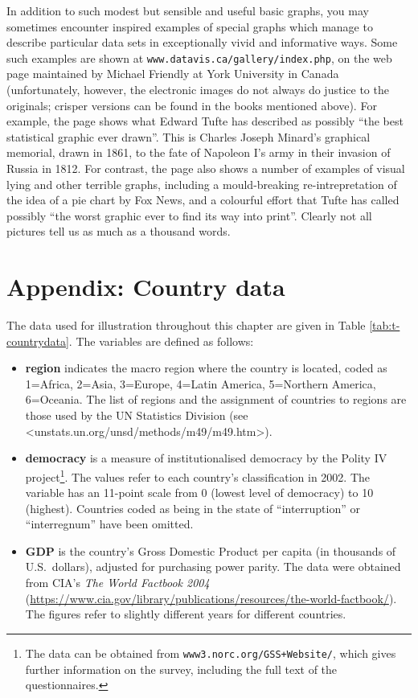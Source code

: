\documentclass[11pt,a4paper,openany]{book}
\let\rmarkdownfootnote\footnote%
\def\footnote{\protect\rmarkdownfootnote}
\begin{document}
In addition to such modest but sensible and useful basic graphs, you may
sometimes encounter inspired examples of special graphs which manage to
describe particular data sets in exceptionally vivid and informative
ways. Some such examples are shown at
\texttt{www.datavis.ca/gallery/index.php}, on the web page maintained by
Michael Friendly at York University in Canada (unfortunately, however,
the electronic images do not always do justice to the originals; crisper
versions can be found in the books mentioned above). For example, the
page shows what Edward Tufte has described as possibly ``the best
statistical graphic ever drawn''. This is Charles Joseph Minard's
graphical memorial, drawn in 1861, to the fate of Napoleon I's army in
their invasion of Russia in 1812. For contrast, the page also shows a
number of examples of visual lying and other terrible graphs, including
a mould-breaking re-intrepretation of the idea of a pie chart by Fox
News, and a colourful effort that Tufte has called possibly ``the worst
graphic ever to find its way into print''. Clearly not all pictures tell
us as much as a thousand words.

\section{Appendix: Country data}\label{s-descr1-app}

The data used for illustration throughout this chapter are given in
Table \ref{tab:t-countrydata}. The variables are defined as follows:

\begin{itemize}
\item
  \textbf{region} indicates the macro region where the country is
  located, coded as 1=Africa, 2=Asia, 3=Europe, 4=Latin America,
  5=Northern America, 6=Oceania. The list of regions and the assignment
  of countries to regions are those used by the UN Statistics Division
  (see
  \textless{}unstats.un.org/unsd/methods/m49/m49.htm\textgreater{}).
\item
  \textbf{democracy} is a measure of institutionalised democracy by the
  Polity IV project\footnote{The data can be obtained from
    \texttt{www3.norc.org/GSS+Website/}, which gives further information
    on the survey, including the full text of the questionnaires.}. The
  values refer to each country's classification in 2002. The variable
  has an 11-point scale from 0 (lowest level of democracy) to 10
  (highest). Countries coded as being in the state of ``interruption''
  or ``interregnum'' have been omitted.
\item
  \textbf{GDP} is the country's Gross Domestic Product per capita (in
  thousands of U.S.~dollars), adjusted for purchasing power parity. The
  data were obtained from CIA's \emph{The World Factbook 2004}
  (\url{https://www.cia.gov/library/publications/resources/the-world-factbook/}).
  The figures refer to slightly different years for different countries.
\end{itemize}
\end{document}
